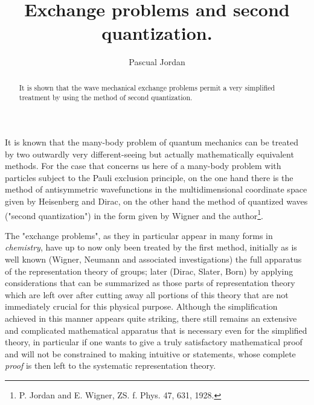 \begin{paper}{1}
\begin{header}
\title{Exchange problems and second quantization.}
\author{Pascual Jordan}
\makeheader
\end{header}


\begin{abstract}
It is shown that the wave mechanical exchange problems permit a very simplified treatment by using the method of second quantization.
\end{abstract}

\section{} It is known that the many-body problem of quantum mechanics can be treated by two outwardly very different-seeing but actually mathematically equivalent methods. For the case that concerns us here of a many-body problem with particles subject to the Pauli exclusion principle, on the one hand there is the method of antisymmetric wavefunctions in the multidimensional coordinate space given by Heisenberg and Dirac, on the other hand the method of quantized waves ("second quantization") in the form given by Wigner and the author\footnote{P. Jordan and E. Wigner, ZS. f. Phys. 47, 631, 1928.}.

The "exchange problems", as they in particular appear in many forms in \textit{chemistry}, have up to now only been treated by the first method, initially as is well known (Wigner, Neumann and associated investigations)  the full apparatus of the representation theory of groups; later (Dirac, Slater, Born) by applying considerations that can be summarized as those parts of representation theory which are left over after cutting away all portions of this theory that are not immediately crucial for this physical purpose. Although the simplification achieved in this manner appears quite striking, there still remains an extensive and complicated mathematical apparatus that is necessary even for the simplified theory, in particular if one wants to give a truly satisfactory mathematical proof and will not be constrained to making intuitive or  statements, whose complete \textit{proof} is then left to the systematic representation theory.


\end{paper}

